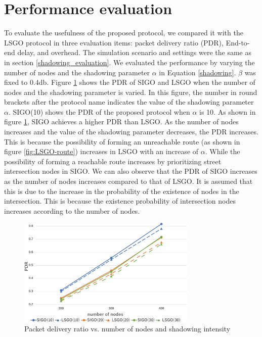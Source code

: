 \documentclass[conference]{IEEEtran}
\begin{document}
\section{Performance evaluation}
\label{evaluation}
To evaluate the usefulness of the proposed protocol, we compared it with the LSGO protocol in three evaluation items: packet delivery ratio (PDR), End-to-end delay, and overhead.
The simulation scenario and settings were the same as in section \ref{shadowing_evaluation}. 
We evaluated the performance by varying the number of nodes and the shadowing parameter $\alpha$ in Equation \ref{shadowing}. 
$\beta$ was fixed to 0.4db.
Figure \ref{fig:PDR} shows the PDR of SIGO and LSGO when the number of nodes and the shadowing parameter is varied. 
In this figure, the number in round brackets after the protocol name indicates the value of the shadowing parameter $\alpha$. SIGO(10) shows the PDR of the proposed protocol when $\alpha$ is 10. As shown in figure \ref{fig:PDR}, SIGO achieves a higher PDR than LSGO. As the number of nodes increases and the value of the shadowing parameter decreases, the PDR increases. This is because the possibility of forming an unreachable route (as shown in figure \ref{fig:LSGO-route}) increases in LSGO with an increase of $\alpha$. While the possibility of forming a reachable route increases by prioritizing street intersection nodes in SIGO.
We can also observe that the PDR of SIGO increases as the number of nodes increases compared to that of LSGO. It is assumed that this is due to the increase in the probability of the existence of nodes in the intersection. 
This  is because the existence probability of intersection nodes increases according to the number of nodes.

\begin{figure}[!ht]
\centering
\includegraphics[width=85mm]{figures/PDR.eps}
\caption{Packet delivery ratio vs. number of nodes and shadowing intensity}
\label{fig:PDR}
\end{figure}
\end{document}

